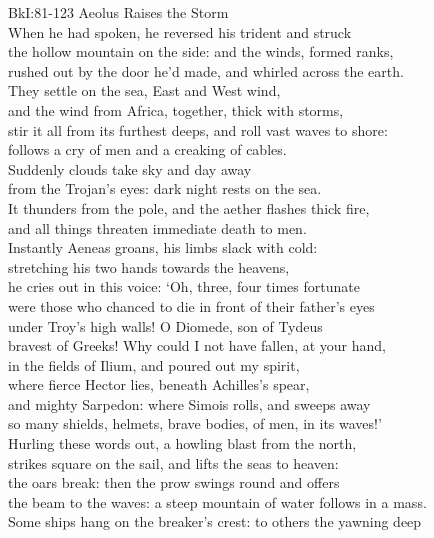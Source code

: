 \documentclass[10pt, a5paper, titlepage]{minimal}
\begin{document}
{BkI:81-123 Aeolus Raises the Storm}\\
When he had spoken, he reversed his trident and struck\\
the hollow mountain on the side: and the winds, formed ranks,\\
rushed out by the door he'd made, and whirled across the earth.\\
They settle on the sea, East and West wind,\\
and the wind from Africa, together, thick with storms,\\
stir it all from its furthest deeps, and roll vast waves to shore:\\
follows a cry of men and a creaking of cables.\\
Suddenly clouds take sky and day away\\
from the Trojan's eyes: dark night rests on the sea.\\
It thunders from the pole, and the aether flashes thick fire,\\
and all things threaten immediate death to men.\\
Instantly Aeneas groans, his limbs slack with cold:\\
stretching his two hands towards the heavens,\\
he cries out in this voice: `Oh, three, four times fortunate\\
were those who chanced to die in front of their father's eyes\\
under Troy's high walls! O Diomede, son of Tydeus\\
bravest of Greeks! Why could I not have fallen, at your hand,\\
in the fields of Ilium, and poured out my spirit,\\
where fierce Hector lies, beneath Achilles's spear,\\
and mighty Sarpedon: where Simois rolls, and sweeps away\\
so many shields, helmets, brave bodies, of men, in its waves!'\\
Hurling these words out, a howling blast from the north,\\
strikes square on the sail, and lifts the seas to heaven:\\
the oars break: then the prow swings round and offers\\
the beam to the waves: a steep mountain of water follows in a mass.\\
Some ships hang on the breaker's crest: to others the yawning deep\\
\end{document}
